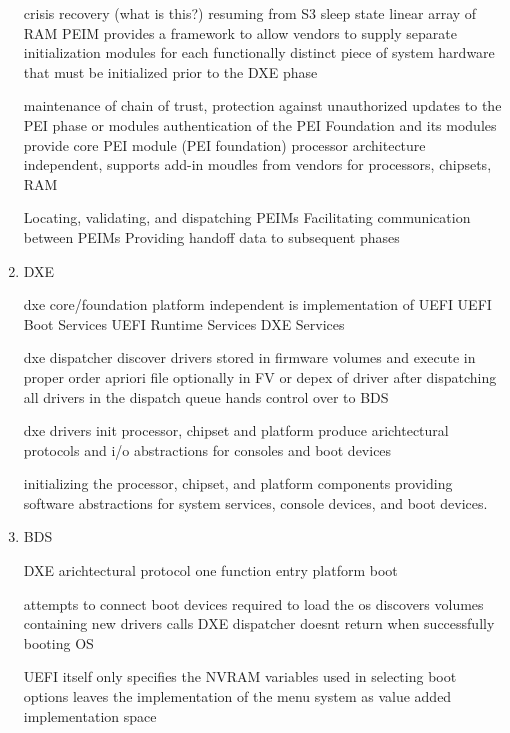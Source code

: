 \begin{enumerate}
    crisis recovery (what is this?)
    resuming from S3 sleep state
    linear array of RAM
    \ac{PEIM} provides a framework to allow vendors to supply separate initialization modules for
    each functionally distinct piece of system hardware that must be initialized prior to the DXE phase \cite{pi-spec}

    maintenance of chain of trust, protection against unauthorized updates to the PEI phase or modules
    authentication of the PEI Foundation and its modules
    provide core PEI module (PEI foundation) processor architecture independent, supports add-in moudles from vendors for processors, chipsets, RAM

    Locating, validating, and dispatching PEIMs
    Facilitating communication between PEIMs
    Providing handoff data to subsequent phases

    \item{\acf{DXE}}

    dxe core/foundation
    platform independent
    is implementation of UEFI
    UEFI Boot Services
    UEFI Runtime Services
    DXE Services

    dxe dispatcher
    discover drivers stored in firmware volumes and execute in proper order
    apriori file optionally in FV or depex of driver
    after dispatching all drivers in the dispatch queue hands control over to BDS

    dxe drivers
    init processor, chipset and platform
    produce arichtectural protocols and i/o abstractions for consoles and boot devices

    initializing the processor, chipset, and platform components
    providing software abstractions for system services, console devices, and boot devices.

    \item{\acf{BDS}}

    DXE arichtectural protocol
    one function entry
    platform boot

    attempts to connect boot devices required to load the os
    discovers volumes containing new drivers
    calls DXE dispatcher
    doesnt return when successfully booting OS

    UEFI itself only specifies the NVRAM variables used in selecting boot options
    leaves the implementation of the menu system as value added implementation space \cite{uefi-spec}

    \cite{pi-spec}


\end{enumerate}
